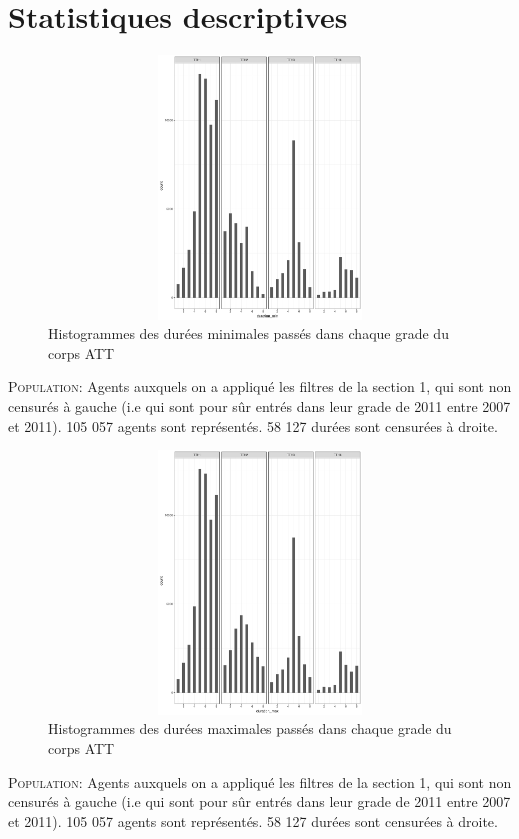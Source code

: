 \documentclass[11pt,a4paper]{article}
\begin{document}
\section{Statistiques descriptives}
\begin{figure}[H] 
	\caption{Histogrammes des durées minimales passés dans chaque grade du corps ATT}
	\label{transit1} 
	\includegraphics[width = 15cm, height=7cm, keepaspectratio]{hist_duration_min.pdf} 
\end{figure}
\begin{minipage}{15cm}
	\footnotesize
	\textsc{Population:} Agents auxquels on a appliqué les filtres de la section 1, qui sont non censurés à gauche (i.e qui sont pour sûr entrés dans leur grade de 2011 entre 2007 et 2011). 105 057 agents sont représentés. 58 127 durées sont censurées à droite.\\
\end{minipage}

\begin{figure}[H] 
	\caption{Histogrammes des durées maximales passés dans chaque grade du corps ATT}
	\label{transit1} 
	\includegraphics[width = 12cm, height=7cm, keepaspectratio]{hist_duration_max.pdf} 
\end{figure}
\begin{minipage}{15cm}
	\footnotesize
	\textsc{Population:} Agents auxquels on a appliqué les filtres de la section 1, qui sont non censurés à gauche (i.e qui sont pour sûr entrés dans leur grade de 2011 entre 2007 et 2011). 105 057 agents sont représentés. 58 127 durées sont censurées à droite.\\
\end{minipage}
\end{document}
